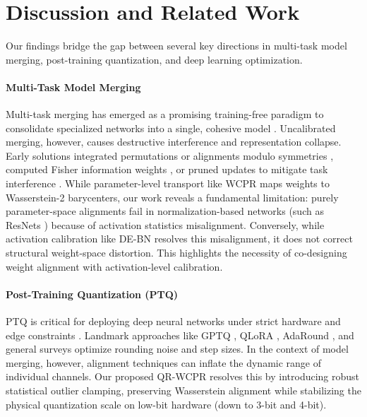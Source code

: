 \documentclass{article}
\theoremstyle{plain}
\theoremstyle{definition}
\theoremstyle{remark}
\begin{document}
\section{Discussion and Related Work}
Our findings bridge the gap between several key directions in multi-task model merging, post-training quantization, and deep learning optimization.

\paragraph{Multi-Task Model Merging}
Multi-task merging has emerged as a promising training-free paradigm to consolidate specialized networks into a single, cohesive model \cite{ilharco2023editing, wortsman2022robust, wortsman2022model, choshen2022fusing, ortiz2023task}. Uncalibrated merging, however, causes destructive interference and representation collapse. Early solutions integrated permutations or alignments modulo symmetries \cite{ainsworth2023git, stoica2023zipit, NEURIPS2020_Singh}, computed Fisher information weights \cite{matena2022merging}, or pruned updates to mitigate task interference \cite{yadav2023ties, yu2023language}. While parameter-level transport like WCPR \cite{theorist2026} maps weights to Wasserstein-2 barycenters, our work reveals a fundamental limitation: purely parameter-space alignments fail in normalization-based networks (such as ResNets \cite{he2016deep}) because of activation statistics misalignment. Conversely, while activation calibration like DE-BN \cite{methodologist2026} resolves this misalignment, it does not correct structural weight-space distortion. This highlights the necessity of co-designing weight alignment with activation-level calibration.

\paragraph{Post-Training Quantization (PTQ)}
PTQ is critical for deploying deep neural networks under strict hardware and edge constraints \cite{han2015deep, jacob2018quantization}. Landmark approaches like GPTQ \cite{frantar2023gptq}, QLoRA \cite{dettmers2023qlora}, AdaRound \cite{nagel2020up}, and general surveys \cite{gholami2021survey, krishnamoorthi2018quantizing} optimize rounding noise and step sizes. In the context of model merging, however, alignment techniques can inflate the dynamic range of individual channels. Our proposed QR-WCPR resolves this by introducing robust statistical outlier clamping, preserving Wasserstein alignment while stabilizing the physical quantization scale on low-bit hardware (down to 3-bit and 4-bit).
\end{document}
